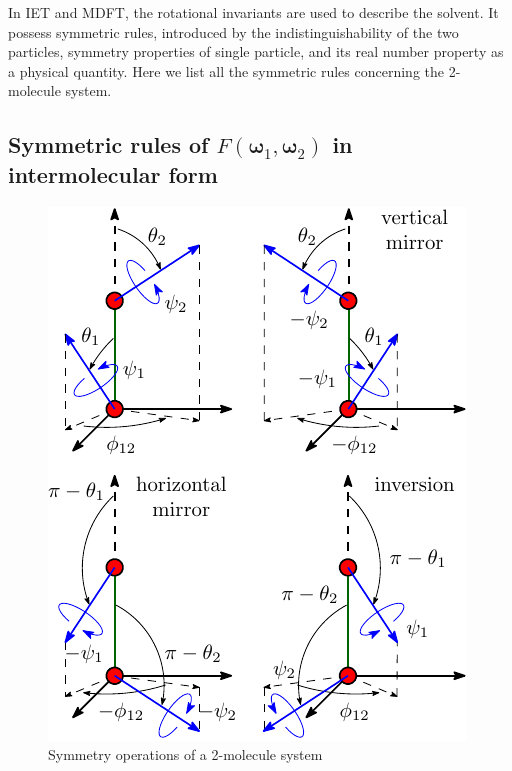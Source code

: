 In \acs{IET} and \acs{MDFT}, the rotational invariants are used
to describe the solvent. It possess symmetric rules, introduced by
the indistinguishability of the two particles, symmetry properties
of single particle, and its real number property as a physical quantity.
Here we list all the symmetric rules concerning the 2-molecule system.

\subsection{Symmetric rules of $F(\boldsymbol{\omega}_{1},\boldsymbol{\omega}_{2})$
in intermolecular form\label{subsec:Symmetric-dcf}}

\begin{figure}[h]
\begin{centering}
\includegraphics{_figure/symmetry_dcf}
\par\end{centering}
\caption{Symmetry operations of a 2-molecule system\label{fig:Symmetry-operations}}
\end{figure}

